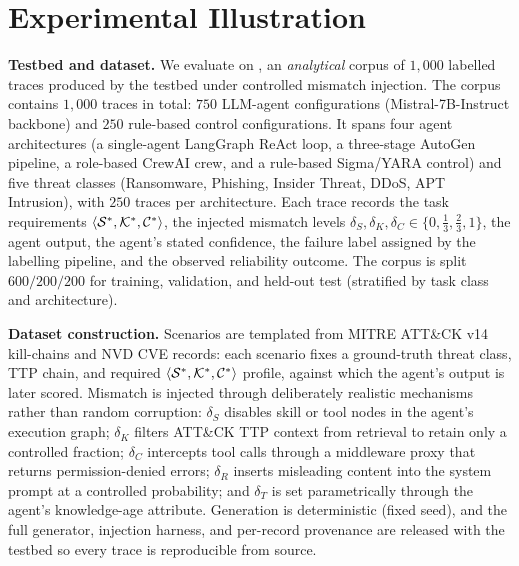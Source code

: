 \section{Experimental Illustration}
\label{sec:experimental}

\textbf{Testbed and dataset.} We evaluate \ARES{} on
\SAFK{}, an \textit{analytical} corpus of $1{,}000$ labelled traces
produced by the \ARESBench{} testbed under controlled mismatch injection.
The corpus
contains $1{,}000$ traces in total: $750$ LLM-agent configurations
(Mistral-7B-Instruct backbone) and $250$ rule-based control configurations.
It spans four agent architectures (a single-agent LangGraph ReAct loop, a
three-stage AutoGen pipeline, a role-based CrewAI crew, and a rule-based
Sigma/YARA control) and five threat classes (Ransomware, Phishing, Insider
Threat, DDoS, APT Intrusion), with $250$ traces per architecture. Each trace records the task requirements
$\langle\mathcal{S}^*,\mathcal{K}^*,\mathcal{C}^*\rangle$, the injected mismatch levels
$\delta_S,\delta_K,\delta_C \in \{0,\tfrac{1}{3},\tfrac{2}{3},1\}$, the
agent output, the agent's stated confidence, the failure label assigned by
the labelling pipeline, and the observed reliability outcome.
The corpus is split $600/200/200$ for training, validation, and held-out
test (stratified by task class and architecture).

\textbf{Dataset construction.} Scenarios are templated from MITRE
ATT\&CK v14 kill-chains and NVD CVE records: each scenario fixes a
ground-truth threat class, TTP chain, and required
$\langle\mathcal{S}^*,\mathcal{K}^*,\mathcal{C}^*\rangle$ profile, against which the agent's
output is later scored. Mismatch is injected through deliberately
realistic mechanisms rather than random corruption: $\delta_S$
disables skill or tool nodes in the agent's execution graph;
$\delta_K$ filters ATT\&CK TTP context from retrieval to retain only a
controlled fraction; $\delta_C$ intercepts tool calls through a
middleware proxy that returns permission-denied errors; $\delta_R$
inserts misleading content into the system prompt at a controlled
probability; and $\delta_T$ is set parametrically through the agent's
knowledge-age attribute. Generation is deterministic (fixed seed), and
the full generator, injection harness, and per-record provenance are
released with the testbed so every trace is reproducible from source.


